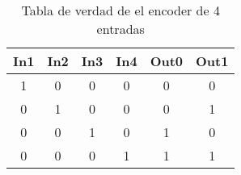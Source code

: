     \begin{table}[H]
        \center
        \begin{tabular}{|cccc|cc|}
        \hline
        \multicolumn{1}{|l}{\textbf{In1}} & \multicolumn{1}{l}{\textbf{In2}} & \multicolumn{1}{l}{\textbf{In3}} & \multicolumn{1}{l|}{\textbf{In4}} & \multicolumn{1}{l}{\textbf{Out0}} & \multicolumn{1}{l|}{\textbf{Out1}} \\ \hline
        1                                 & 0                                & 0                                & 0                                 & 0                                 & 0                                  \\
        0                                 & 1                                & 0                                & 0                                 & 0                                 & 1                                  \\
        0                                 & 0                                & 1                                & 0                                 & 1                                 & 0                                  \\
        0                                 & 0                                & 0                                & 1                                 & 1                                 & 1                                  \\ \hline
        \end{tabular}
        \caption{Tabla de verdad de el encoder de 4 entradas}
        \end{table}